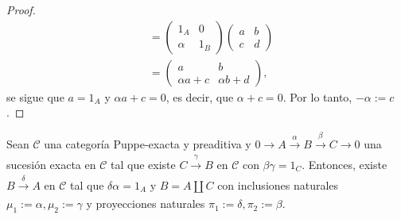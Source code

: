 \documentclass[tesis]{subfiles}
\begin{document}
\begin{proof}
\begin{align*}
                            &= \begin{pmatrix} 1_A &0 \\ \alpha &1_B \end{pmatrix} \begin{pmatrix} a &b \\ c &d \end{pmatrix} \\
                            &= \begin{pmatrix} a &b \\ \alpha a+c &\alpha b + d \end{pmatrix},
    \end{align*}
    se sigue que $a = 1_A$ y $\alpha a+c = 0$, es decir, que $\alpha+c=0$. Por lo tanto, $-\alpha:= c$. 
\end{proof}


\begin{Lema}\label{Mendoza-1.9.17}
    Sean $\mathscr{C}$ una categoría Puppe-exacta y preaditiva y $0\to A\xrightarrow[]{\alpha}B\xrightarrow[]{\beta}C\to 0$ una sucesión exacta en $\mathscr{C}$ tal que existe $C\xrightarrow[]{\gamma}B$ en $\mathscr{C}$ con $\beta\gamma=1_C$. Entonces, existe $B\xrightarrow[]{\delta}A$ en $\mathscr{C}$ tal que $\delta\alpha = 1_A$ y $B=A\coprod C$ con inclusiones naturales $\mu_1:= \alpha, \mu_2:= \gamma$ y proyecciones naturales $\pi_1:=\delta, \pi_2:=\beta$. %
\end{Lema}
\end{document}
